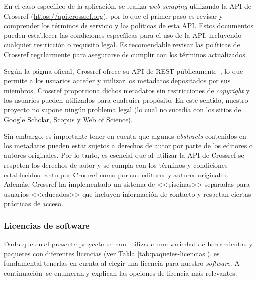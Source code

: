 En el caso específico de la aplicación, se realiza \textit{web scraping} utilizando la API de Crossref (\url{https://api.crossref.org}), por lo que el primer paso es revisar y comprender los términos de servicio y las políticas de esta API. Estos documentos pueden establecer las condiciones específicas para el uso de la API, incluyendo cualquier restricción o requisito legal. Es recomendable revisar las políticas de Crossref regularmente para asegurarse de cumplir con los términos actualizados. 

Según la página oficial, Crossref ofrece su API de REST públicamente~\cite{Rosa2020}, lo que permite a los usuarios acceder y utilizar los metadatos depositados por sus miembros. Crossref proporciona dichos metadatos sin restricciones de \textit{copyright} y los usuarios pueden utilizarlos para cualquier propósito. En este sentido, nuestro proyecto no supone ningún problema legal (lo cual no sucedía con los sitios de Google Scholar, Scopus y Web of Science).

Sin embargo, es importante tener en cuenta que algunos \textit{abstracts} contenidos en los metadatos pueden estar sujetos a derechos de autor por parte de los editores o autores originales. Por lo tanto, es esencial que al utilizar la API de Crossref se respeten los derechos de autor y se cumpla con los términos y condiciones establecidos tanto por Crossref como por sus editores y autores originales. Además, Crossref ha implementado un sistema de <<piscinas>> separadas para usuarios <<educados>> que incluyen información de contacto y respetan ciertas prácticas de acceso.

\newpage
\subsubsection{Licencias de software}

Dado que en el presente proyecto se han utilizado una variedad de herramientas y paquetes con diferentes licencias (ver Tabla \ref{tab:paquetes-licencias}), es fundamental tenerlas en cuenta al elegir una licencia para nuestro \textit{software}. A continuación, se enumeran y explican las opciones de licencia más relevantes:

